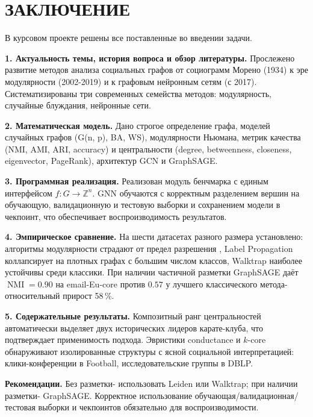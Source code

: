 \documentclass[14pt,a4paper]{extarticle}
\begin{document}
\section*{ЗАКЛЮЧЕНИЕ}

В курсовом проекте решены все поставленные во введении задачи.

\textbf{1. Актуальность темы, история вопроса и обзор литературы.} Прослежено развитие методов анализа социальных графов от социограмм Морено \cite{moreno1934} (1934) к эре модулярности \cite{girvan2002,blondel2008,traag2019} (2002-2019) и к графовым нейронным сетям \cite{kipf2017,hamilton2017} (с 2017). Систематизированы три современных семейства методов: модулярность, случайные блуждания, нейронные сети.

\textbf{2. Математическая модель.} Дано строгое определение графа, моделей случайных графов (G(n, p), BA, WS), модулярности Ньюмана, метрик качества (NMI, AMI, ARI, accuracy) и центральности (degree, betweenness, closeness, eigenvector, PageRank), архитектур GCN и GraphSAGE.

\textbf{3. Программная реализация.} Реализован модуль бенчмарка с единым интерфейсом $f \colon G \to \mathbb{Z}^n$. GNN обучаются с корректным разделением вершин на обучающую, валидационную и тестовую выборки и сохранением модели в чекпоинт, что обеспечивает воспроизводимость результатов.

\textbf{4. Эмпирическое сравнение.} На шести датасетах разного размера установлено: алгоритмы модулярности страдают от предел разрешения \cite{fortunato2007}, Label Propagation \cite{raghavan2007} коллапсирует на плотных графах с большим числом классов, Walktrap \cite{pons2006} наиболее устойчивы среди классики. При наличии частичной разметки GraphSAGE \cite{hamilton2017} даёт $\operatorname{NMI} = 0.90$ на email-Eu-core против $0.57$ у лучшего классического метода- относительный прирост 58\,\%.

\textbf{5. Содержательные результаты.} Композитный ранг центральностей автоматически выделяет двух исторических лидеров карате-клуба, что подтверждает применимость подхода. Эвристики conductance и $k$-core обнаруживают изолированные структуры с ясной социальной интерпретацией: клики-конференции в Football, исследовательские группы в DBLP.

\textbf{Рекомендации.} Без разметки- использовать Leiden или Walktrap; при наличии разметки- GraphSAGE. Корректное использование обучающая/валидационная/тестовая выборки и чекпоинтов обязательно для воспроизводимости.
\end{document}
